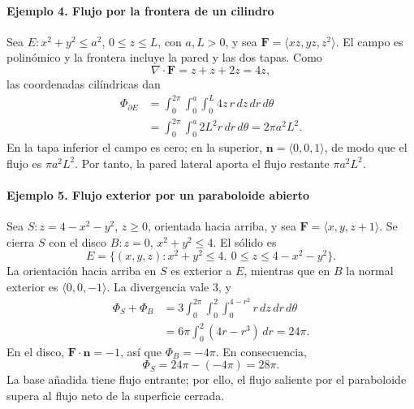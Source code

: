\paragraph{Ejemplo 4. Flujo por la frontera de un cilindro}
Sea $E:x^2+y^2\leq a^2$, $0\leq z\leq L$, con $a,L>0$, y sea $\mathbf F=\langle xz,yz,z^2\rangle$. El campo es polinómico y la frontera incluye la pared y las dos tapas. Como
\[
\nabla\cdot\mathbf F=z+z+2z=4z,
\]
las coordenadas cilíndricas dan
\begin{align*}
\Phi_{\partial E}
&=\int_0^{2\pi}\int_0^a\int_0^L4z\,r\,dz\,dr\,d\theta\\
&=\int_0^{2\pi}\int_0^a2L^2r\,dr\,d\theta
=2\pi a^2L^2.
\end{align*}
En la tapa inferior el campo es cero; en la superior, $\mathbf n=\langle0,0,1\rangle$, de modo que el flujo es $\pi a^2L^2$. Por tanto, la pared lateral aporta el flujo restante $\pi a^2L^2$.

\begingroup\shorthandoff{>}
\begin{center}
\end{center}
\endgroup

\paragraph{Ejemplo 5. Flujo exterior por un paraboloide abierto}
Sea $S:z=4-x^2-y^2$, $z\geq0$, orientada hacia arriba, y sea $\mathbf F=\langle x,y,z+1\rangle$. Se cierra $S$ con el disco $B:z=0$, $x^2+y^2\leq4$. El sólido es
\[
E=\{(x,y,z):x^2+y^2\leq4,\ 0\leq z\leq4-x^2-y^2\}.
\]
La orientación hacia arriba en $S$ es exterior a $E$, mientras que en $B$ la normal exterior es $\langle0,0,-1\rangle$. La divergencia vale $3$, y
\begin{align*}
\Phi_S+\Phi_B
&=3\int_0^{2\pi}\int_0^2\int_0^{4-r^2}r\,dz\,dr\,d\theta\\
&=6\pi\int_0^2(4r-r^3)\,dr
=24\pi.
\end{align*}
En el disco, $\mathbf F\cdot\mathbf n=-1$, así que $\Phi_B=-4\pi$. En consecuencia,
\[
\Phi_S=24\pi-(-4\pi)=28\pi.
\]
La base añadida tiene flujo entrante; por ello, el flujo saliente por el paraboloide supera al flujo neto de la superficie cerrada.

